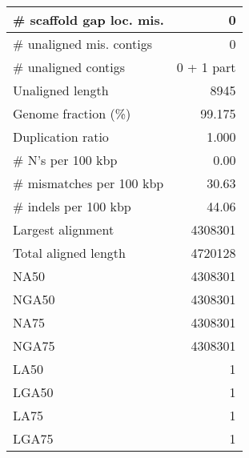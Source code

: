\documentclass[12pt,a4paper]{article}
\begin{document}
\begin{table}[ht]
\begin{center}
\begin{tabular}{|l*{1}{|r}|}
\# scaffold gap loc. mis. & 0 \\ \hline
\# unaligned mis. contigs & 0 \\ \hline
\# unaligned contigs & 0 + 1 part \\ \hline
Unaligned length & 8945 \\ \hline
Genome fraction (\%) & 99.175 \\ \hline
Duplication ratio & 1.000 \\ \hline
\# N's per 100 kbp & 0.00 \\ \hline
\# mismatches per 100 kbp & 30.63 \\ \hline
\# indels per 100 kbp & 44.06 \\ \hline
Largest alignment & 4308301 \\ \hline
Total aligned length & 4720128 \\ \hline
NA50 & 4308301 \\ \hline
NGA50 & 4308301 \\ \hline
NA75 & 4308301 \\ \hline
NGA75 & 4308301 \\ \hline
LA50 & 1 \\ \hline
LGA50 & 1 \\ \hline
LA75 & 1 \\ \hline
LGA75 & 1 \\ \hline
\end{tabular}
\end{center}
\end{table}
\end{document}

